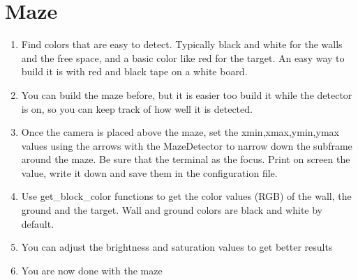 \section{Maze}

    \begin{enumerate}
        \item Find colors that are easy to detect. Typically black and 
            white for the walls and the free space, and a basic color 
            like red for the target. An easy way to build it is with red 
            and black tape on a white board.
        \item You can build the maze before, but it is easier too build 
            it while the detector is on, so you can keep track of how 
            well it is detected.
        \item Once the camera is placed above the maze, set the 
            xmin,xmax,ymin,ymax values using the arrows with the 
            MazeDetector to narrow down the subframe around the maze. 
            Be sure that the terminal as the focus. Print on screen the 
            value, write it down and save them in the configuration file.
        \item Use get\_block\_color functions to get the color values 
            (RGB) of the wall, the ground and the target. Wall and ground 
            colors are black and white by default.
        \item You can adjust the brightness and saturation values to get 
            better results
        \item You are now done with the maze
    \end{enumerate}

